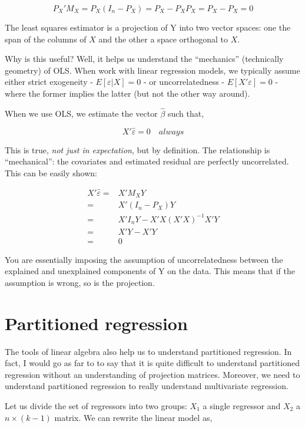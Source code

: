\documentclass[
  letterpaper,
  DIV=11,
  numbers=noendperiod]{scrreprt}
\begin{document}
\[
P_X'M_X = P_X(I_n-P_X) = P_X-P_XP_X = P_X-P_X = 0
\]

The least squares estimator is a projection of Y into two vector spaces:
one the span of the columns of \(X\) and the other a space orthogonal to
\(X\).

Why is this useful? Well, it helps us understand the ``mechanics''
(technically geometry) of OLS. When work with linear regression models,
we typically assume either strict exogeneity - \(E[\varepsilon|X]=0\) -
or uncorrelatedness - \(E[X'\varepsilon]=0\) - where the former implies
the latter (but not the other way around).

When we use OLS, we estimate the vector \(\hat{\beta}\) such that,

\[
X'\hat{\varepsilon}=0 \quad always
\]

This is true, \emph{not just in expectation}, but by definition. The
relationship is ``mechanical'': the covariates and estimated residual
are perfectly uncorrelated. This can be easily shown:

\[
\begin{align}
X'\hat{\varepsilon} =& X'M_XY \\
=& X'(I_n-P_X)Y \\
=&X'I_nY-X'X(X'X)^{-1}X'Y \\
=&X'Y-X'Y \\
=&0
\end{align}
\]

You are essentially imposing the assumption of uncorrelatedness between
the explained and unexplained components of Y on the data. This means
that if the assumption is wrong, so is the projection.

\hypertarget{partitioned-regression}{%
\section{Partitioned regression}\label{partitioned-regression}}

The tools of linear algebra also help us to understand partitioned
regression. In fact, I would go as far to to say that it is quite
difficult to understand partitioned regression without an understanding
of projection matrices. Moreover, we need to understand partitioned
regression to really understand multivariate regression.

Let us divide the set of regressors into two groups: \(X_1\) a single
regressor and \(X_2\) a \(n\times (k-1)\) matrix. We can rewrite the
linear model as,
\end{document}
